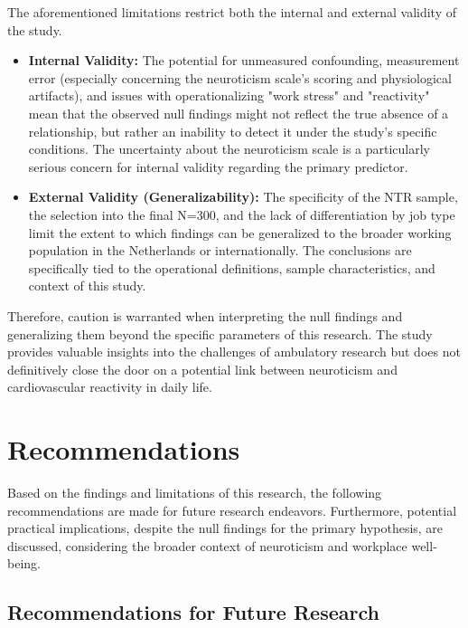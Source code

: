 \documentclass[11pt, a4paper]{report}
\begin{document}
The aforementioned limitations restrict both the internal and external validity of the study.
\begin{itemize}
    \item \textbf{Internal Validity:} The potential for unmeasured confounding, measurement error (especially concerning the neuroticism scale's scoring and physiological artifacts), and issues with operationalizing "work stress" and "reactivity" mean that the observed null findings might not reflect the true absence of a relationship, but rather an inability to detect it under the study's specific conditions. The uncertainty about the neuroticism scale is a particularly serious concern for internal validity regarding the primary predictor.
    \item \textbf{External Validity (Generalizability):} The specificity of the NTR sample, the selection into the final N=300, and the lack of differentiation by job type limit the extent to which findings can be generalized to the broader working population in the Netherlands or internationally. The conclusions are specifically tied to the operational definitions, sample characteristics, and context of this study.
\end{itemize}
Therefore, caution is warranted when interpreting the null findings and generalizing them beyond the specific parameters of this research. The study provides valuable insights into the challenges of ambulatory research but does not definitively close the door on a potential link between neuroticism and cardiovascular reactivity in daily life.


\chapter{Recommendations}
\label{ch:recommendations_main} %

Based on the findings and limitations of this research, the following recommendations are made for future research endeavors. Furthermore, potential practical implications, despite the null findings for the primary hypothesis, are discussed, considering the broader context of neuroticism and workplace well-being.

\section{Recommendations for Future Research}
\label{sec:recommendations_research_main} %
\end{document}
